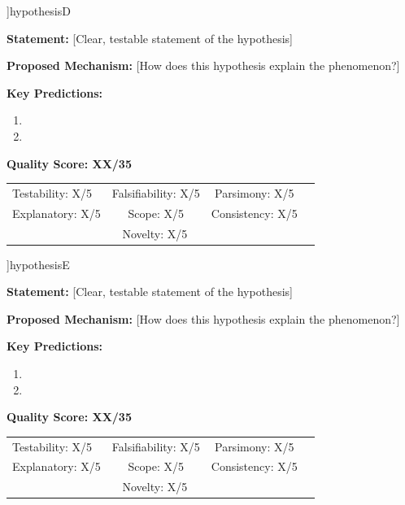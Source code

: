 \documentclass[11pt,a4paper]{article}
\begin{document}
\vspace{0.5em}

\begin{hypothesisbox}[H4: [Hypothesis Name]]{hypothesisD}

\textbf{Statement:} [Clear, testable statement of the hypothesis]

\textbf{Proposed Mechanism:} [How does this hypothesis explain the phenomenon?]

\textbf{Key Predictions:}
\begin{enumerate}
    \item [Prediction 1]
    \item [Prediction 2]
\end{enumerate}

\textbf{Quality Score: XX/35}
\begin{center}
\footnotesize
\begin{tabular}{lccc}
Testability: X/5 & Falsifiability: X/5 & Parsimony: X/5 \\
Explanatory: X/5 & Scope: X/5 & Consistency: X/5 \\
\multicolumn{3}{c}{Novelty: X/5}
\end{tabular}
\end{center}
\end{hypothesisbox}

\vspace{0.5em}

\begin{hypothesisbox}[H5: [Hypothesis Name]]{hypothesisE}

\textbf{Statement:} [Clear, testable statement of the hypothesis]

\textbf{Proposed Mechanism:} [How does this hypothesis explain the phenomenon?]

\textbf{Key Predictions:}
\begin{enumerate}
    \item [Prediction 1]
    \item [Prediction 2]
\end{enumerate}

\textbf{Quality Score: XX/35}
\begin{center}
\footnotesize
\begin{tabular}{lccc}
Testability: X/5 & Falsifiability: X/5 & Parsimony: X/5 \\
Explanatory: X/5 & Scope: X/5 & Consistency: X/5 \\
\multicolumn{3}{c}{Novelty: X/5}
\end{tabular}
\end{center}
\end{hypothesisbox}
\end{document}
